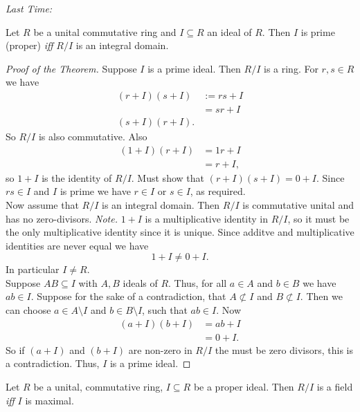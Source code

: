 \documentclass[twoside, openright, fontsize=10pt, headings=big]{scrbook}
\begin{document}
\textit{Last Time:}
\begin{theorem}{}{}
    Let $R$ be a unital commutative ring and $I\subseteq R$ an ideal of $R$. Then $I$ is prime (proper) \textit{iff} $R/I$ is an integral domain.
\end{theorem}
\begin{proof}[Proof of the Theorem]
    Suppose $I$ is a prime ideal. Then $R/I$ is a ring. For $r,s\in R$ we have 
    \begin{align*}
        (r+I)(s+I)&:=rs+I\\
        &=sr+I\\
        (s+I)(r+I).
    \end{align*}
    So $R/I$ is also commutative. Also
    \begin{align*}
        (1+I)(r+I)&=1r+I\\
        &=r+I,
    \end{align*}
    so $1+I$ is the identity of $R/I$. Must show that $(r+I)(s+I)=0+I$. Since $rs\in I$ and $I$ is prime we have $r\in I$ or $s\in I$, as required.\\
    Now assume that $R/I$ is an integral domain. Then $R/I$ is commutative unital and has no zero-divisors. \textit{Note.} $1+I$ is a multiplicative identity in $R/I$, so it must be the only multiplicative identity since it is unique. Since additve and multiplicative identities are never equal we have
    \[
        1+I\neq 0+I.
    \]
    In particular $I\neq R$.\\
    Suppose $AB\subseteq I$ with $A,B$ ideals of $R$. Thus, for all $a\in A$ and $b\in B$ we have $ab\in I$. Suppose for the sake of a contradiction, that $A\not\subset I$ and $B\not\subset I$. Then we can choose $a\in A\setminus I$ and $b\in B\setminus I$, such that $ab\in I$. Now
    \begin{align*}
        (a+I)(b+I)&=ab+I\\
        &=0+I.
    \end{align*}
    So if $(a+I)$ and $(b+I)$ are non-zero in $R/I$ the must be zero divisors, this is a contradiction. Thus, $I$ is a prime ideal.
\end{proof}
\begin{theorem}{}{}
    Let $R$ be a unital, commutative ring, $I\subseteq R$ be a proper ideal. Then $R/I$ is a field \textit{iff} $I$ is maximal. 
\end{theorem}
\end{document}
